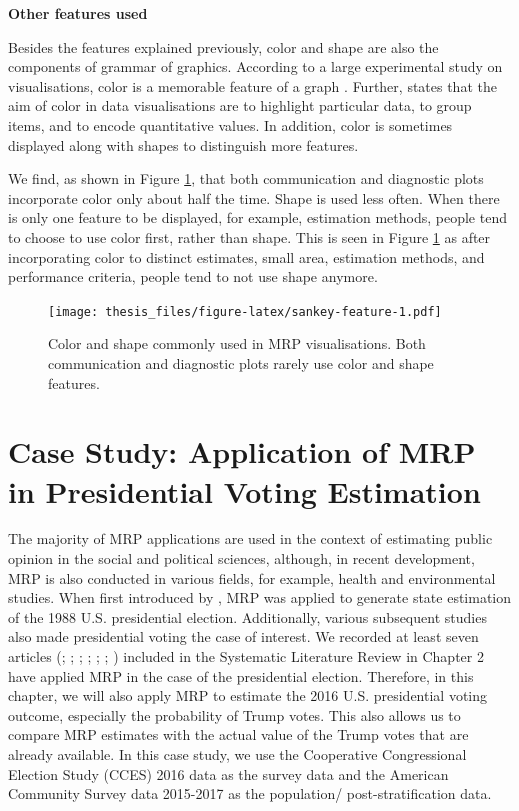 \documentclass{monashthesis}
\begin{document}
\textbf{Other features used}

Besides the features explained previously, color and shape are also the components of grammar of graphics. According to a large experimental study on visualisations, color is a memorable feature of a graph \autocite{MIDWAY2020100141}. Further, \textcite{few_2008} states that the aim of color in data visualisations are to highlight particular data, to group items, and to encode quantitative values. In addition, color is sometimes displayed along with shapes to distinguish more features.

We find, as shown in Figure \ref{fig:sankey-feature}, that both communication and diagnostic plots incorporate color only about half the time. Shape is used less often. When there is only one feature to be displayed, for example, estimation methods, people tend to choose to use color first, rather than shape. This is seen in Figure \ref{fig:sankey-feature} as after incorporating color to distinct estimates, small area, estimation methods, and performance criteria, people tend to not use shape anymore.

\begin{figure}
\centering
\texttt{[image: thesis\_files/figure-latex/sankey-feature-1.pdf]}
\caption{\label{fig:sankey-feature}Color and shape commonly used in MRP visualisations. Both communication and diagnostic plots rarely use color and shape features.}
\end{figure}

\hypertarget{case-study-application-of-mrp-in-presidential-voting-estimation}{%
\chapter{Case Study: Application of MRP in Presidential Voting Estimation}\label{case-study-application-of-mrp-in-presidential-voting-estimation}}

The majority of MRP applications are used in the context of estimating public opinion in the social and political sciences, although, in recent development, MRP is also conducted in various fields, for example, health and environmental studies. When first introduced by \textcite{Gelman97poststratificationinto}, MRP was applied to generate state estimation of the 1988 U.S. presidential election. Additionally, various subsequent studies also made presidential voting the case of interest. We recorded at least seven articles (\textcite{GelmanAndrew2014HBAC}; \textcite{GhitzaYair2013DIwM}; \textcite{KiewietdeJongeChadP2018PSPE}; \textcite{LauderdaleBenjaminE2020Mppf}; \textcite{LeiRayleigh2017T2EA}; \textcite{ParkDavidK2004BMEw}; \textcite{WangWei2015Fewn}) included in the Systematic Literature Review in Chapter 2 have applied MRP in the case of the presidential election. Therefore, in this chapter, we will also apply MRP to estimate the 2016 U.S. presidential voting outcome, especially the probability of Trump votes. This also allows us to compare MRP estimates with the actual value of the Trump votes that are already available. In this case study, we use the Cooperative Congressional Election Study (CCES) 2016 data \autocite{cces_data} as the survey data and the American Community Survey data 2015-2017 \autocite{acs_data} as the population/ post-stratification data.
\end{document}
